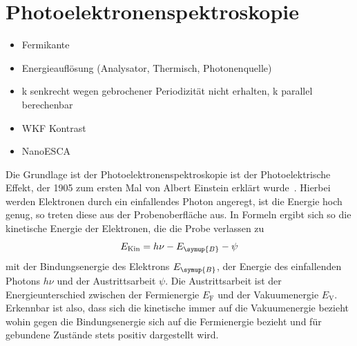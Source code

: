     
    \section{Photoelektronenspektroskopie} \label{sec:PES}
        \begin{itemize}
            \item Fermikante
            \item Energieauflösung (Analysator, Thermisch, Photonenquelle)
            \item k senkrecht wegen gebrochener Periodizität nicht erhalten, k parallel berechenbar
            \item WKF Kontrast
            \item NanoESCA
        \end{itemize}
        Die Grundlage ist der Photoelektronenspektroskopie ist der Photoelektrische Effekt, der 1905 zum ersten Mal von Albert Einstein erklärt wurde~\cite{Einstein}.
        Hierbei werden Elektronen durch ein einfallendes Photon angeregt, ist die Energie hoch genug, so treten diese aus der Probenoberfläche aus.
        In Formeln ergibt sich so die kinetische Energie der Elektronen, die die Probe verlassen zu 
        \begin{equation}
            E_{\text{Kin}} = h \nu - E_{\symup{B}} - \psi
            \label{eqn:Photoeffekt}
        \end{equation}
        mit der Bindungsenergie des Elektrons $E_{\symup{B}}$, der Energie des einfallenden Photons $h \nu$ und der Austrittsarbeit $\psi$.
        Die Austrittsarbeit ist der Energieunterschied zwischen der Fermienergie $E_\text{F}$ und der Vakuumenergie $E_\text{V}$.
        Erkennbar ist also, dass sich die kinetische immer auf die Vakuumenergie bezieht wohin gegen die Bindungsenergie sich auf die Fermienergie bezieht und für gebundene Zustände stets positiv dargestellt wird.
        
